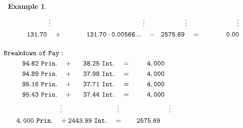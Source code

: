 \documentclass[12pt,letterpaper,oneside]{article}
\newtheorem{example}{Example}[section]
\theoremstyle{remark} %
\begin{document}
\begin{example}
\begin{align*}
	&\qquad\ \ \ \ \vdots\qquad\qquad\qquad\qquad\qquad\quad\ \ \ \ \ \ \ \vdots\qquad\qquad\quad\ \,\ \vdots\qquad\qquad\qquad\:\ \ \ \vdots\\
	&\!\!\!\!\!\!\!\ \ \ \ \mathtt{131.70}\quad +\qquad\ \ \ \ \,\mathtt{131.70}\cdot \mathtt{\rate}\quad -\ \ \mathtt{2575.69}\quad =\quad\ \ \ \ \ \ \ \ \mathtt{0.00}\\[12pt]
	&\!\!\!\!\!\!\!\!\!\!\!\!\!\!\!\!\!\!\!\mathtt{Breakdown\ of\ Pay:}\\
	&\!\!\!\mathtt{94.62\ Prin.}\quad +\quad\;\:\mathtt{38.25\ Int.}\quad =\quad\quad\,\,\mathtt{\amount}\\
	&\!\!\!\mathtt{94.89\ Prin.}\quad +\quad\;\:\mathtt{37.98\ Int.}\quad =\quad\quad\,\,\mathtt{\amount}\\
	&\!\!\!\mathtt{95.16\ Prin.}\quad +\quad\;\:\mathtt{37.71\ Int.}\quad =\quad\quad\,\,\mathtt{\amount}\\
	&\!\!\!\mathtt{95.43\ Prin.}\quad +\quad\;\:\mathtt{37.44\ Int.}\quad =\quad\quad\,\,\mathtt{\amount}\\
	&\qquad\quad\ \ \ \ \ \ \vdots \qquad\qquad\qquad\quad\ \ \; \vdots \qquad\qquad\qquad\quad\:\vdots\\
	&\!\!\!\!\!\!\!\!\mathtt{\balanceitf\ Prin.}\quad +\!\!\!\!\!\!\quad\mathtt{2443.99\ Int.}\quad =\quad\ \ \; \mathtt{2575.69}
	\end{align*}
	\end{example}

	\normalsize
	\newpage
\end{document}

